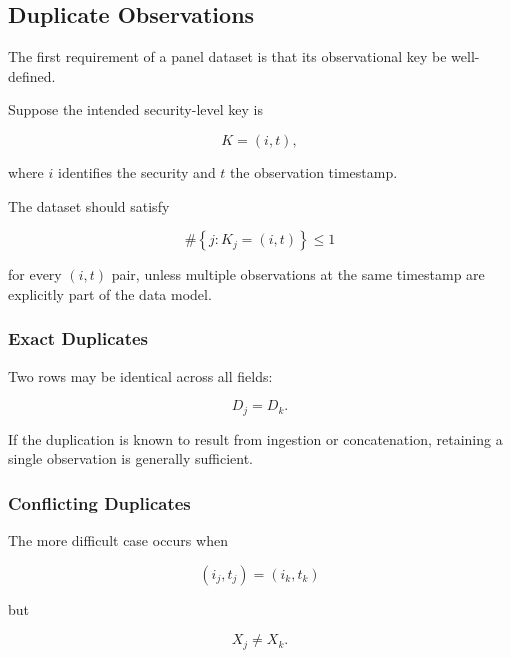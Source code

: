 \documentclass[11pt,a4paper]{article}
\begin{document}
\subsection{Duplicate Observations}
\label{subsec:duplicate_observations}

The first requirement of a panel dataset is that its observational key be
well-defined.

Suppose the intended security-level key is

\begin{equation}
K
=
(i,t),
\end{equation}

where $i$ identifies the security and $t$ the observation timestamp.

The dataset should satisfy

\begin{equation}
\boxed{
\#\left\{
j:
K_j=(i,t)
\right\}
\leq 1
}
\end{equation}

for every $(i,t)$ pair, unless multiple observations at the same timestamp are
explicitly part of the data model.


\subsubsection{Exact Duplicates}

Two rows may be identical across all fields:

\begin{equation}
D_j=D_k.
\end{equation}

If the duplication is known to result from ingestion or concatenation, retaining
a single observation is generally sufficient.


\subsubsection{Conflicting Duplicates}

The more difficult case occurs when

\begin{equation}
(i_j,t_j)
=
(i_k,t_k)
\end{equation}

but

\begin{equation}
X_j
\neq
X_k.
\end{equation}
\end{document}
